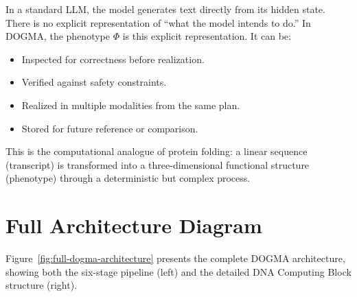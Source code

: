 \begin{keyinsight}
In a standard LLM, the model generates text directly from its hidden state. There is no explicit representation of ``what the model intends to do.'' In DOGMA, the phenotype $\Phi$ is this explicit representation. It can be:
\begin{itemize}[leftmargin=1.5em]
  \item Inspected for correctness before realization.
  \item Verified against safety constraints.
  \item Realized in multiple modalities from the same plan.
  \item Stored for future reference or comparison.
\end{itemize}
This is the computational analogue of protein folding: a linear sequence (transcript) is transformed into a three-dimensional functional structure (phenotype) through a deterministic but complex process.
\end{keyinsight}

\section{Full Architecture Diagram}
\label{sec:full-architecture}

Figure~\ref{fig:full-dogma-architecture} presents the complete DOGMA architecture, showing both the six-stage pipeline (left) and the detailed DNA Computing Block structure (right).

